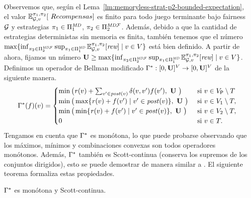 Observemos que, según el Lema~\ref{lm:memoryless-strat-p2-bounded-expectation}, el valor $\Expect{\strat{1}}{\strat{2}}_{\StochG,v}[\ Recompensas]$ es finito
para todo juego terminante bajo fairness $\mathcal{G}$ y estrategias $\pi_{1} \in \Pi^{\textit{MD}}_{1}$, $\pi_{2} \in \Pi^{\textit{MD}\mathcal{F}}_{2}$.
 Además, debido a que la cantidad de estrategias deterministas sin memoria es finita, también tenemos que el número
 $\max \{ \inf_{\pi_{2} \in \Pi^{\textit{MD}\mathcal{F}}_{2}} \sup_{\pi_{1} \in \Pi^{\textit{MD}}_{1}} \mathbb{E}^{\pi_{1}, \pi_{ 2}}_{\mathcal{G},v}[\textit{rew}] \mid v \in V \}$ está bien definido.
      A partir de ahora, fijamos un número $\mathbf{U} \geq \max \{ \inf_{\pi_{2} \in \Pi^{\textit{MD}\mathcal{F}}_{2}} \sup_{\pi_{1} \in \Pi^{\textit{MD}}_{1}} \mathbb{E}^{\pi_{1}, \pi_{2}}_{\mathcal{G},v}[\textit{rew}] \mid v \in V \}$. Definimos un operador de Bellman modificado
$\Gamma^*: [0,\mathbf{U}]^V \rightarrow [0,\mathbf{U}]^V$ de la siguiente manera.
\[
    \Bellman(f)(v) =
    \begin{cases}
          \min \big( \reward(v) + \sum_{v' \in \post(v)} \delta(v,v')  f(v'),  \ \UpperBound \ \big ) &  \text{ si } v \in V_\Probabilistic \setminus T  \\
          \min\big( \max\{\reward(v)  + f(v') \mid v' \in \post(v) \}, \ \UpperBound  \ \big)& \text{ si } v \in  V_1 \setminus T, \\
          \min\big( \min\{\reward(v)  + f(v') \mid v' \in \post(v) \}, \ \UpperBound \ \big) & \text{ si } v \in  V_2 \setminus T, \\
           0 & \text{ si } v \in T.
    \end{cases}
\]
Tengamos en cuenta que $\Gamma^*$ es monótona, lo que puede probarse observando que los máximos, mínimos y combinaciones convexas son todos operadores monótonos.
Además, $\Gamma^*$ también es Scott-continua (conserva los supremos de los conjuntos dirigidos), esto se puede demostrar de manera similar a \cite{DBLP:conf/memics/BrazdilKN12}. El siguiente teorema
formaliza estas propiedades.
\begin{proposition}\label{pn:continuity} $\Gamma^*$ es monótona y Scott-continua.
\end{proposition}

